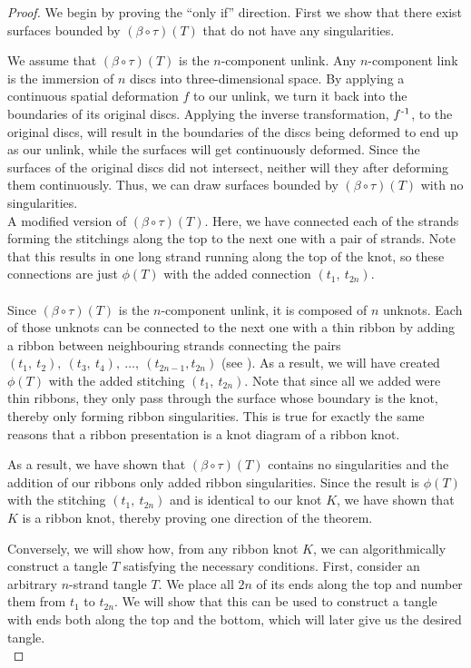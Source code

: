 \documentclass{ws-jktr}
\begin{document}
\begin{proof}
We begin by proving the ``only if'' direction.
First we show that there exist surfaces bounded by $(\beta\circ\tau)(T)$ that do
not have any singularities.

We assume that $(\beta\circ\tau)(T)$ is the $n$-component unlink.
Any $n$-component link is the immersion of $n$ discs into three-dimensional
space.
By applying a continuous spatial deformation $f$ to our unlink, we turn it back
into the boundaries of its original discs.
Applying the inverse transformation, $f^{\text-1}$, to the original discs, will
result in the boundaries of the discs being deformed to end up as our unlink,
while the surfaces will get continuously deformed.
Since the surfaces of the original discs did not intersect, neither will they
after deforming them continuously.
Thus, we can draw surfaces bounded by $(\beta\circ\tau)(T)$ with no
singularities.\\

{A modified version of $(\beta\circ\tau)(T)$.
Here, we have connected each of the strands forming the stitchings along the top
to the next one with a pair of strands.
Note that this results in one long strand running along the top of the knot, so
these connections are just $\phi(T)$ with the added connection
$(t_1,~t_{2n})$.}\\\\

Since $(\beta\circ\tau)(T)$ is the $n$-component unlink, it is composed of $n$
unknots.
Each of those unknots can be connected to the next one with a thin ribbon by
adding a ribbon between neighbouring strands connecting the pairs
$(t_1,~t_2),~(t_3,~t_4),~\dots,~(t_{2n-1},t_{2n})$ (see \figProof).
As a result, we will have created $\phi(T)$ with the added stitching
$(t_1,~t_{2n})$.
Note that since all we added were thin ribbons, they only pass through the
surface whose boundary is the knot, thereby only forming ribbon singularities.
This is true for exactly the same reasons that a ribbon presentation is a knot
diagram of a ribbon knot.

As a result, we have shown that $(\beta\circ\tau)(T)$ contains no singularities
and the addition of our ribbons only added ribbon singularities.
Since the result is $\phi(T)$ with the stitching $(t_1,~t_{2n})$ and is
identical to our knot $K$, we have shown that $K$ is a ribbon knot, thereby
proving one direction of the theorem.

Conversely, we will show how, from any ribbon knot $K$, we can algorithmically
construct a tangle $T$ satisfying the necessary conditions.
First, consider an arbitrary $n$-strand tangle $T$.
We place all $2n$ of its ends along the top and number them from $t_1$ to
$t_{2n}$.
We will show that this can be used to construct a tangle with ends both along
the top and the bottom, which will later give us the desired tangle.\\


\end{proof}
\end{document}
